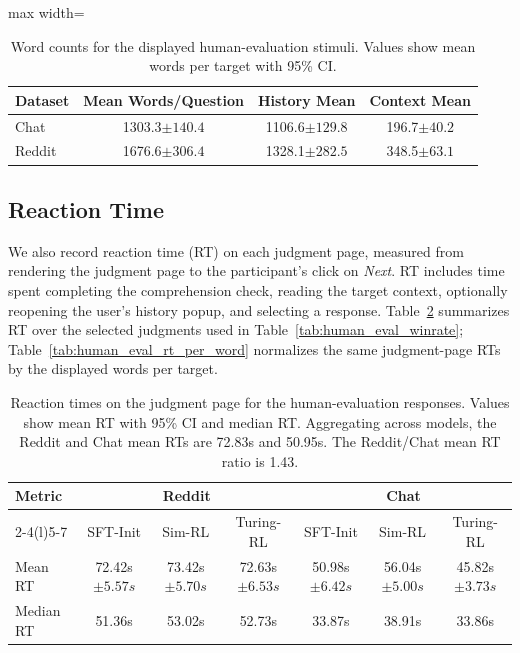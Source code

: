 \documentclass{article} %
\newcommand{\subtle}[1]{{\tiny\color[gray]{0.4}#1}}
\begin{document}
\begin{table}[t]
\centering
\small
\setlength{\tabcolsep}{4pt}
\begin{adjustbox}{max width=\linewidth}
\begin{tabular}{@{}lccc@{}}
\toprule
Dataset & Mean Words/Question & History Mean & Context Mean \\
\midrule
Chat & 1303.3\subtle{$\pm 140.4$} & 1106.6\subtle{$\pm 129.8$} & 196.7\subtle{$\pm 40.2$} \\
Reddit & 1676.6\subtle{$\pm 306.4$} & 1328.1\subtle{$\pm 282.5$} & 348.5\subtle{$\pm 63.1$} \\
\bottomrule
\end{tabular}
\end{adjustbox}
\caption{Word counts for the displayed human-evaluation stimuli. Values show mean words per target with 95\% CI.}
\label{tab:human_eval_word_counts}
\end{table}

\subsection{Reaction Time}
We also record reaction time (RT) on each judgment page, measured from rendering the judgment page to the participant's click on \textit{Next}. RT includes time spent completing the comprehension check, reading the target context, optionally reopening the user's history popup, and selecting a response. Table~\ref{tab:human_eval_rt} summarizes RT over the selected judgments used in Table~\ref{tab:human_eval_winrate}; Table~\ref{tab:human_eval_rt_per_word} normalizes the same judgment-page RTs by the displayed words per target.

\begin{table}[t]
\centering
\small
\setlength{\tabcolsep}{3.5pt}
\begin{tabular*}{\textwidth}{@{\extracolsep{\fill}}lcccccc@{}}
\toprule
\multirow{2}{*}{Metric} & \multicolumn{3}{c}{Reddit} & \multicolumn{3}{c}{Chat} \\
\cmidrule(lr){2-4}\cmidrule(l){5-7}
 & SFT-Init & Sim-RL & Turing-RL & SFT-Init & Sim-RL & Turing-RL \\
\midrule
Mean RT & 72.42s\subtle{$\pm 5.57s$} & 73.42s\subtle{$\pm 5.70s$} & 72.63s\subtle{$\pm 6.53s$} & 50.98s\subtle{$\pm 6.42s$} & 56.04s\subtle{$\pm 5.00s$} & 45.82s\subtle{$\pm 3.73s$} \\
Median RT & 51.36s & 53.02s & 52.73s & 33.87s & 38.91s & 33.86s \\
\bottomrule
\end{tabular*}
\caption{Reaction times on the judgment page for the human-evaluation responses. Values show mean RT with 95\% CI and median RT. Aggregating across models, the Reddit and Chat mean RTs are 72.83s and 50.95s. The Reddit/Chat mean RT ratio is 1.43.}
\label{tab:human_eval_rt}
\end{table}
\end{document}
